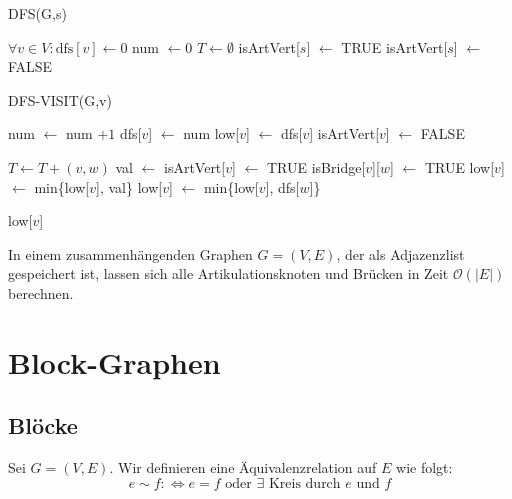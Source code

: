 \documentclass[a4paper]{report}
\begin{document}
\begin{algorithm}
    \caption{DFS(G,s)}
    \begin{algorithmic}[1]
        \State $\forall v \in V : \text{dfs}[v] \leftarrow 0$
        \State num $\leftarrow 0$ 
        \State $T \leftarrow \emptyset$ 
        \State {}
            \State isArtVert[$s$] $\leftarrow$ TRUE
        \Else
        \State isArtVert[$s$] $\leftarrow$ FALSE
        \EndIf
    \end{algorithmic}
\end{algorithm}
\pagebreak
\begin{algorithm}
    \caption{DFS-VISIT(G,v)}
    \begin{algorithmic}[1]
        \State num $\leftarrow$ num $ + 1$
        \State dfs[$v$] $\leftarrow$ num
        \State low[$v$] $\leftarrow$ dfs[$v$]
        \State isArtVert[$v$] $\leftarrow$ FALSE

                \State $T \leftarrow T + (v,w)$
                \State val $\leftarrow$  
                \State isArtVert[$v$] $\leftarrow$ TRUE
                        \State isBridge[$v$][$w$] $\leftarrow$ TRUE
                    \EndIf
                \EndIf
                \State low[$v$] $\leftarrow$ min\{low[$v$], val\}
            \Else {}
                \State low[$v$] $\leftarrow$ min\{low[$v$], dfs[$w$]\}
            \EndIf
        \EndFor

        \State \Return low[$v$]
    \end{algorithmic}
\end{algorithm}


\begin{satz}[Satz]
    In einem zusammenhängenden Graphen $G = (V,E)$, der als Adjazenzlist gespeichert ist, lassen sich
    alle Artikulationsknoten und Brücken in Zeit $\mathcal{O}(|E|)$ berechnen.
\end{satz}
\bigskip

\chapter{Block-Graphen}
\section{Blöcke}
\begin{definition}
    Sei $G = (V,E)$. Wir definieren eine Äquivalenzrelation auf $E$ wie folgt:
    $$e \sim f: \Leftrightarrow e = f \text{  oder  } \exists \text{ Kreis durch } e \text{ und } f$$
\end{definition}
\bigskip
\end{document}
